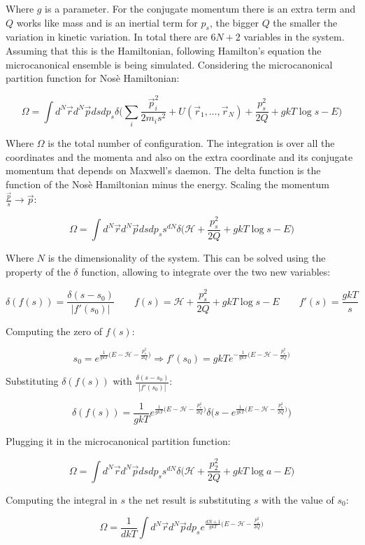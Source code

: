 Where $g$ is a parameter.
For the conjugate momentum there is an extra term and $Q$ works like mass and is an inertial term for $p_s$, the bigger $Q$ the smaller the variation in kinetic variation.
In total there are $6N + 2$ variables in the system.
Assuming that this is the Hamiltonian, following Hamilton's equation the microcanonical ensemble is being simulated.
Considering the microcanonical partition function for Nos\`e Hamiltonian:

$$\Omega = \int d^N\vec{r}d^N\vec{p}dsdp_s\delta\biggl(\sum\limits_{i}\frac{\vec{p}_i^2}{2m_is^2} + U(\vec{r}_1, \dots, \vec{r}_N) + \frac{p_s^2}{2Q} + gkT\log s - E\biggr)$$

Where $\Omega$ is the total number of configuration.
The integration is over all the coordinates and the momenta and also on the extra coordinate and its conjugate momentum that depends on Maxwell's daemon.
The delta function is the function of the Nos\`e Hamiltonian minus the energy.
Scaling the momentum $\frac{\vec{p}}{s}\rightarrow \vec{p}$:

$$\Omega = \int d^N\vec{r}d^N\vec{p}dsdp_ss^{dN}\delta\biggl(\mathcal{H}+\frac{p_s^2}{2Q} + gkT\log s - E\biggr)$$

Where $N$ is the dimensionality of the system.
This can be solved using the property of the $\delta$ function, allowing to integrate over the two new variables:

$$\delta(f(s)) = \frac{\delta(s-s_0)}{|f'(s_0)|}\qquad f(s) = \mathcal{H}+\frac{p_s^2}{2Q} + gkT\log s - E\qquad f'(s) = \frac{gkT}{s}$$

Computing the zero of $f(s)$:

$$s_0 = e^{\frac{1}{gkT}\bigl(E-\mathcal{H}-\frac{p_s^2}{2Q}\bigr)}\Rightarrow f'(s_0) = gkTe^{-\frac{1}{gkT}\bigl(E-\mathcal{H}-\frac{p_s^2}{2Q}\bigr)}$$

Substituting $\delta(f(s))$ with $\frac{\delta(s-s_0)}{|f'(s_0)|}$:

$$\delta(f(s)) = \frac{1}{gkT}e^{\frac{1}{gkT}\bigl(E-\mathcal{H}-\frac{p_s^2}{2Q}\bigr)}\delta\biggl(s-e^{\frac{1}{gkT}\bigl(E-\mathcal{H}-\frac{p_s^2}{2Q}\bigr)}\biggr)$$

Plugging it in the microcanonical partition function:

$$\Omega = \int d^N\vec{r}d^N\vec{p}dsdp_ss^{dN}\delta\biggl(\mathcal{H}+\frac{p_2^2}{2Q}+gkT\log a-E\biggr)$$

Computing the integral in $s$ the net result is substituting $s$ with the value of $s_0$:

$$\Omega = \frac{1}{dkT}\int d^N\vec{r}d^N\vec{p}dp_se^{\frac{dN+1}{gkT}\bigl(E-\mathcal{H}-\frac{p_s^2}{2Q}\bigr)}$$

